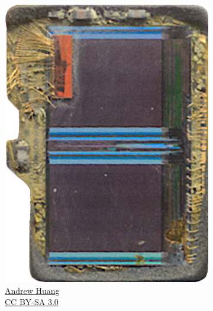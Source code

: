 \documentclass[ngerman]{schoolPres}
\begin{document}
\begin{frame}
\begin{columns}[c]
\begin{column}{.4\linewidth}
\begin{figure}[!ht]
          \begin{subfigure}{.3\linewidth}
            \includegraphics[width=\linewidth]{media/decapsulated-01.jpg}
            \caption{\tiny \href{https://commons.wikimedia.org/wiki/File:Decapsulated\_microSD\_memory\_card\_lineup-genuine,\_questionable,\_and\_fake-counterfeit.jpg}{Andrew Huang\\CC BY-SA 3.0}}
          \end{subfigure}\hspace{4em}
          \begin{subfigure}{.3\linewidth}

\end{subfigure}
\end{figure}
\end{column}
\end{columns}
\end{frame}
\end{document}
